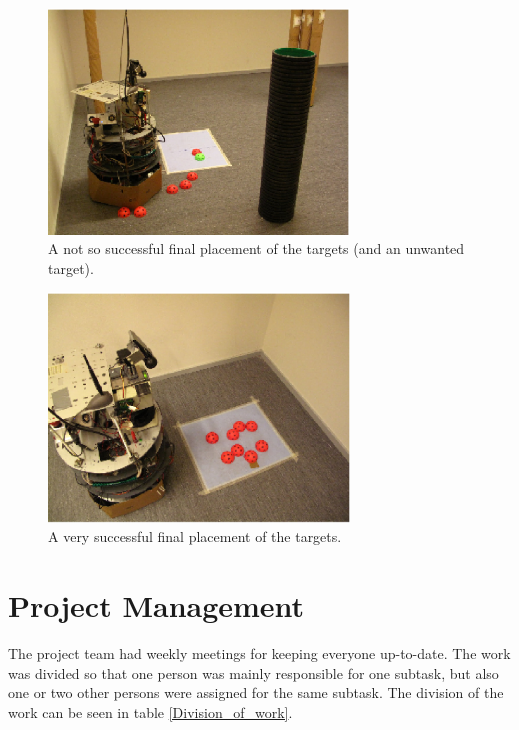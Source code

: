 \documentclass[a4paper,10pt]{article}
\begin{document}
\begin{figure}[!]	%
\begin{center}
\includegraphics[width=8.0cm]{fail.eps}
\caption{A not so successful final placement of the targets (and an unwanted target).}
\label{fail} %
\end{center}
\end{figure}

\begin{figure}[!]	%
\begin{center}
\includegraphics[width=8.0cm]{success.eps}
\caption{A very successful final placement of the targets.}
\label{success} %
\end{center}
\end{figure}

\section{Project Management}

The project team had weekly meetings for keeping everyone up-to-date. The work was divided so that one person was mainly responsible for one subtask, but also one or two other persons were assigned for the same subtask. The division of the work can be seen in table \ref{Division_of_work}.
\end{document}

